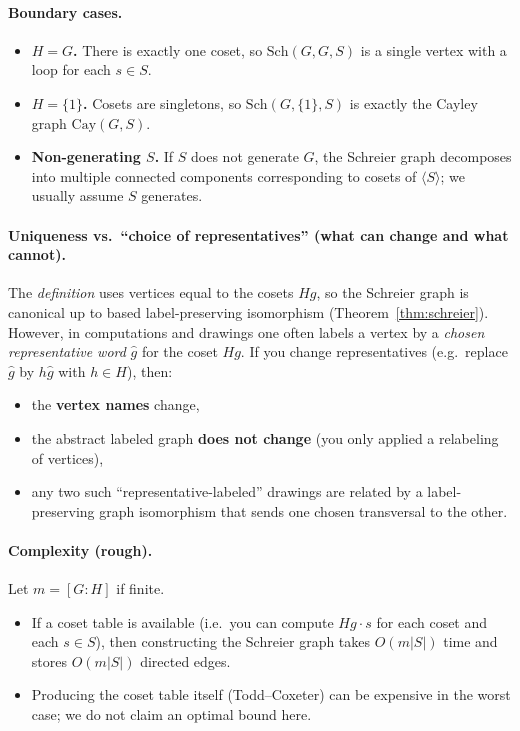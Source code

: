 \documentclass[11pt]{article}
\theoremstyle{definition}
\theoremstyle{plain}
\theoremstyle{remark}
\newcommand{\Cay}{\mathrm{Cay}}
\newcommand{\Sch}{\mathrm{Sch}}
\begin{document}
\paragraph{Boundary cases.}
\begin{itemize}[leftmargin=2em]
\item \textbf{$H=G$.} There is exactly one coset, so $\Sch(G,G,S)$ is a single vertex with a loop for each $s\in S$.
\item \textbf{$H=\{1\}$.} Cosets are singletons, so $\Sch(G,\{1\},S)$ is exactly the Cayley graph $\Cay(G,S)$.
\item \textbf{Non-generating $S$.} If $S$ does not generate $G$, the Schreier graph decomposes into multiple connected components corresponding to cosets of $\langle S\rangle$; we usually assume $S$ generates.
\end{itemize}

\paragraph{Uniqueness vs.\ ``choice of representatives'' (what can change and what cannot).}
The \emph{definition} uses vertices equal to the cosets $Hg$, so the Schreier graph is canonical up to based label-preserving isomorphism (Theorem~\ref{thm:schreier}).
However, in computations and drawings one often labels a vertex by a \emph{chosen representative word} $\widehat g$ for the coset $Hg$.
If you change representatives (e.g.\ replace $\widehat g$ by $h\widehat g$ with $h\in H$), then:
\begin{itemize}[leftmargin=2em]
\item the \textbf{vertex names} change,
\item the abstract labeled graph \textbf{does not change} (you only applied a relabeling of vertices),
\item any two such ``representative-labeled'' drawings are related by a label-preserving graph isomorphism that sends one chosen transversal to the other.
\end{itemize}

\paragraph{Complexity (rough).}\cite{schreier1927,toddcoxeter1936,holt2005}
Let $m=[G:H]$ if finite.
\begin{itemize}[leftmargin=2em]
\item If a coset table is available (i.e.\ you can compute $Hg\cdot s$ for each coset and each $s\in S$), then constructing the Schreier graph takes $O(m|S|)$ time and stores $O(m|S|)$ directed edges.
\item Producing the coset table itself (Todd--Coxeter) can be expensive in the worst case; we do not claim an optimal bound here.
\end{itemize}
\end{document}
